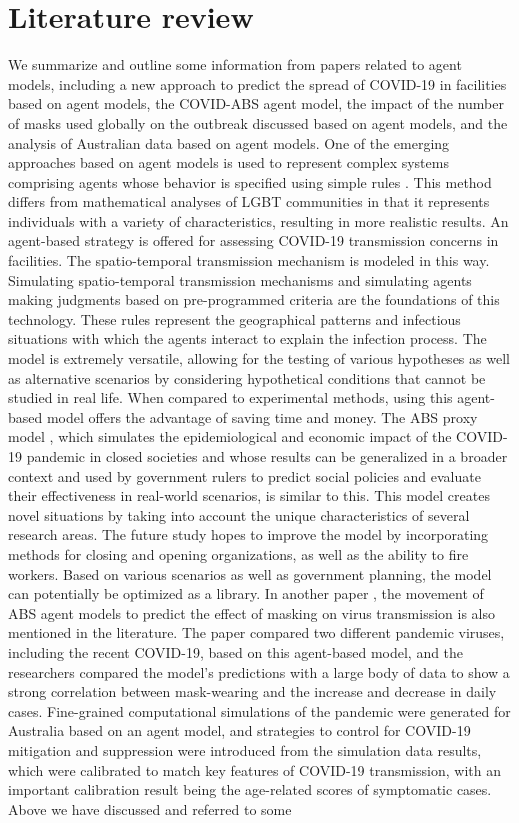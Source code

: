 \section{Literature review}
We summarize and outline some information from papers related to agent models, including a new approach to predict the spread of COVID-19 in facilities based on agent models, the COVID-ABS agent model, the impact of the number of masks used globally on the outbreak discussed based on agent models, and the analysis of Australian data based on agent models. One of the emerging approaches based on agent models is used to represent complex systems comprising agents whose behavior is specified using simple rules \cite{cuevas2020agent}. This method differs from mathematical analyses of LGBT communities in that it represents individuals with a variety of characteristics, resulting in more realistic results. An agent-based strategy is offered for assessing COVID-19 transmission concerns in facilities. The spatio-temporal transmission mechanism is modeled in this way. Simulating spatio-temporal transmission mechanisms and simulating agents making judgments based on pre-programmed criteria are the foundations of this technology. These rules represent the geographical patterns and infectious situations with which the agents interact to explain the infection process. The model is extremely versatile, allowing for the testing of various hypotheses as well as alternative scenarios by considering hypothetical conditions that cannot be studied in real life. When compared to experimental methods, using this agent-based model offers the advantage of saving time and money. The ABS proxy model \cite{silva2020covid}, which simulates the epidemiological and economic impact of the COVID-19 pandemic in closed societies and whose results can be generalized in a broader context and used by government rulers to predict social policies and evaluate their effectiveness in real-world scenarios, is similar to this. This model creates novel situations by taking into account the unique characteristics of several research areas. The future study hopes to improve the model by incorporating methods for closing and opening organizations, as well as the ability to fire workers. Based on various scenarios as well as government planning, the model can potentially be optimized as a library. In another paper \cite{kai2020universal}, the movement of ABS agent models to predict the effect of masking on virus transmission is also mentioned in the literature. The paper compared two different pandemic viruses, including the recent COVID-19, based on this agent-based model, and the researchers compared the model's predictions with a large body of data to show a strong correlation between mask-wearing and the increase and decrease in daily cases. Fine-grained computational simulations \cite{chang2020modelling} of the pandemic were generated for Australia based on an agent model, and strategies to control for COVID-19 mitigation and suppression were introduced from the simulation data results, which were calibrated to match key features of COVID-19 transmission, with an important calibration result being the age-related scores of symptomatic cases. Above we have discussed and referred to some 